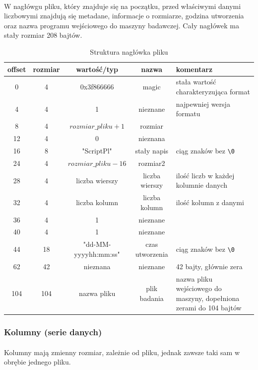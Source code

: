 \documentclass[12pt]{report}
\begin{document}
	\paragraph{}
	W nagłówgu pliku, który znajduje się na początku, przed właściwymi danymi liczbowymi znajdują się metadane, informacje o rozmiarze, godzina utworzenia oraz nazwa programu wejściowego do maszyny badawczej. Cały nagłówek ma stały rozmiar 208 bajtów.
	
	\begin{table}[H]
		\centering
		\caption{Struktura nagłówka pliku}
		\begin{tabular}{|c|c|c|c|p{5.5cm}|} \hline
			offset & rozmiar & wartość/typ & nazwa & komentarz \\\hline
			\hline
			0 &  4 & 0x3f866666 & magic & stała wartość charakteryzująca format \\\hline
			4 &  4 & 1 & nieznane & najpewniej wersja formatu \\\hline
			8 &  4 & $rozmiar\_pliku + 1$ & rozmiar & \\\hline
			12 &  4 & 0 & nieznana &  \\\hline
			16 &  8 & "ScriptPl" & stały napis & ciąg znaków bez \verb|\0| \\\hline
			24 &  4 & $rozmiar\_pliku - 16$ & rozmiar2 &  \\\hline
			28 &  4 & liczba wierszy & liczba wierszy & ilość liczb w każdej kolumnie danych \\\hline
			32 &  4 & liczba kolumn & liczba kolumn & ilość kolumn z danymi \\\hline
			36 &  4 & 1 & nieznane & \\\hline
			40 &  4 & 1 & nieznane & \\\hline
			44 & 18 & "dd-MM-yyyyhh:mm:ss" & czas utworzenia & ciąg znaków bez \verb|\0| \\\hline
			62 & 42 & nieznana & nieznane & 42 bajty, głównie zera \\\hline
			104 & 104 & nazwa pliku & plik badania & nazwa pliku wejściowego do maszyny, dopełniona zerami do 104 bajtów \\\hline
		\end{tabular}
	\end{table}
	
	\pagebreak
	\subsubsection{Kolumny (serie danych)}
	\paragraph{}
	Kolumny mają zmienny rozmiar, zależnie od pliku, jednak zawsze taki sam w obrębie jednego pliku.
	
\end{document}
